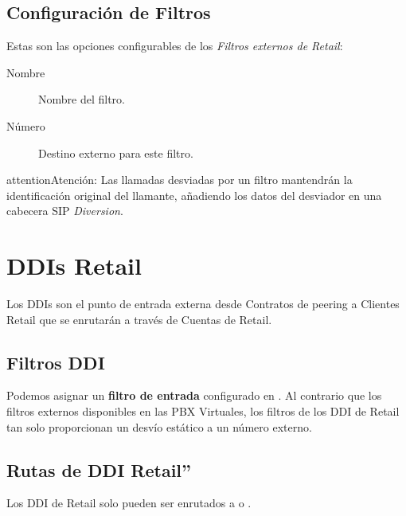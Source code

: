 \documentclass[letterpaper,10pt,spanish]{sphinxmanual}
\begin{document}
\subsection{Configuración de Filtros}
\label{retail/retail_filters:filters-configuration}
Estas son las opciones configurables de los \emph{Filtros externos de Retail}:
\begin{description}
\item[{Nombre}] \leavevmode{}\label{retail/retail_filters:term-name}
Nombre del filtro.

\item[{Número}] \leavevmode{}\label{retail/retail_filters:term-number}
Destino externo para este filtro.

\end{description}

\begin{notice}{attention}{Atención:}
Las llamadas desviadas por un filtro mantendrán la identificación original del llamante, añadiendo los datos del desviador en una cabecera SIP \emph{Diversion}.
\end{notice}


\section{DDIs Retail}
\label{retail/retail_ddis::doc}\label{retail/retail_ddis:retail-ddis}\label{retail/retail_ddis:id1}
Los DDIs son el punto de entrada externa desde Contratos de peering a Clientes Retail que se enrutarán a través de Cuentas de Retail.


\subsection{Filtros DDI}
\label{retail/retail_ddis:ddi-filters}
Podemos asignar un \textbf{filtro de entrada} configurado en {\hyperref[retail/retail_filters:retail\string-filters]{}}. Al contrario que los filtros externos disponibles en las PBX Virtuales, los filtros de los DDI de Retail tan solo proporcionan un desvío estático a un número externo.


\subsection{Rutas de DDI Retail''}
\label{retail/retail_ddis:retail-ddi-routes}
Los DDI de Retail solo pueden ser enrutados a {\hyperref[retail/retail_accounts:retail\string-accounts]{}} o {\hyperref[faxing/index:faxing\string-system]{}}.
\end{document}

